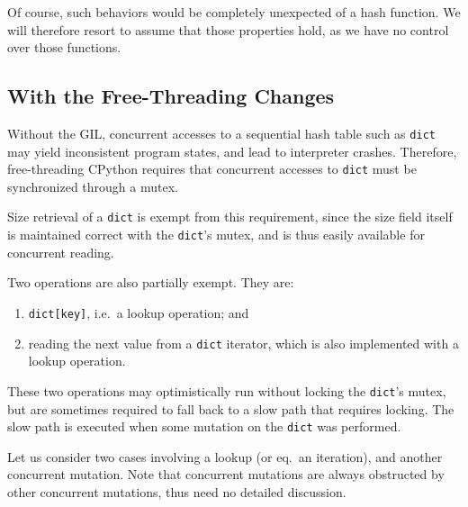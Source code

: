 Of course, such behaviors would be completely unexpected of a hash function.
We will therefore resort to assume that those properties hold, as we have no control over those functions.


\subsection{With the Free-Threading Changes}\label{subsec:dict-free-threading}

Without the GIL, concurrent accesses to a sequential hash table such as \texttt{dict} may yield inconsistent program states, and lead to interpreter crashes.
Therefore, free-threading CPython requires that concurrent accesses to \texttt{dict} must be synchronized through a mutex.

Size retrieval of a \texttt{dict} is exempt from this requirement, since the size field itself is maintained correct with the \texttt{dict}'s mutex, and is thus easily available for concurrent reading.

Two operations are also partially exempt.
They are:
\begin{enumerate}
	\item \texttt{{dict[key]}}, i.e.\ a lookup operation; and
	\item reading the next value from a \texttt{dict} iterator, which is also implemented with a lookup operation.
\end{enumerate}
These two operations may optimistically run without locking the \texttt{dict}'s mutex, but are sometimes required to fall back to a slow path that requires locking.
The slow path is executed when some mutation on the \texttt{dict} was performed.

Let us consider two cases involving a lookup (or eq.\ an iteration), and another concurrent mutation.
Note that concurrent mutations are always obstructed by other concurrent mutations, thus need no detailed discussion.

